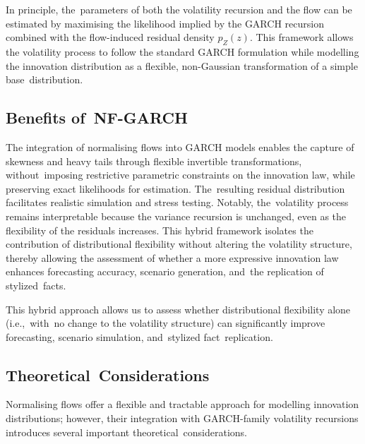 \documentclass[risks,article,accept,pdftex,moreauthors]{Definitions/mdpi}
\begin{document}
In principle, the~parameters of both the volatility recursion and the flow can be estimated by maximising the likelihood implied by the GARCH recursion combined with the flow-induced residual density \( p_Z(z)\). This framework allows the volatility process to follow the standard GARCH formulation while modelling the innovation distribution as a flexible, non-Gaussian transformation of a simple base~distribution.

\subsection{Benefits of~NF-GARCH} 

The integration of normalising flows into GARCH models enables the capture of skewness and heavy tails through flexible invertible transformations, without~imposing restrictive parametric constraints on the innovation law, while preserving exact likelihoods for estimation. The~resulting residual distribution facilitates realistic simulation and stress testing. Notably, the~volatility process remains interpretable because the variance recursion is unchanged, even as the flexibility of the residuals increases. This hybrid framework isolates the contribution of distributional flexibility without altering the volatility structure, thereby allowing the assessment of whether a more expressive innovation law enhances forecasting accuracy, scenario generation, and~the replication of stylized~facts.

This hybrid approach allows us to assess whether distributional flexibility alone (i.e.,~with~no change to the volatility structure) can significantly improve forecasting, scenario simulation, and~stylized fact~replication.


\subsection{Theoretical~Considerations}
Normalising flows offer a flexible and tractable approach for modelling innovation distributions; however, their integration with GARCH-family volatility recursions introduces several important theoretical~considerations.
\end{document}
